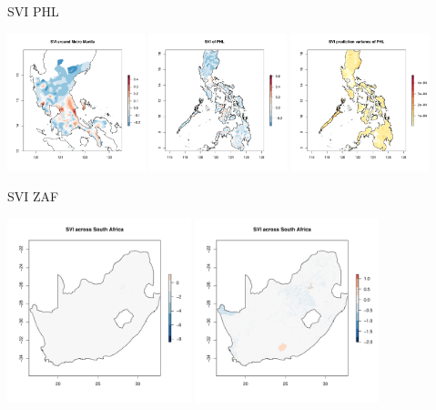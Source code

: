 \documentclass{beamer}
\begin{document}
\begin{frame}{SVI PHL}
  \begin{center}
    \includegraphics[width=0.3\textwidth]{sviNCR}
    \includegraphics[width=0.3\textwidth]{sviPHL}
    \includegraphics[width=0.3\textwidth]{sigmaPHL}
  \end{center}
\end{frame}


\begin{frame}{SVI ZAF}
  \begin{center}
    \includegraphics[width=0.4\textwidth]{sviZAF}
    \includegraphics[width=0.4\textwidth]{sviZAF2}
  \end{center}
\end{frame}
\end{document}

